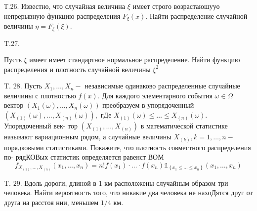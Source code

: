 \documentclass[a4paper,12pt]{article} %
\begin{document}
\begin{example}

Т.26. Известно, что случайная величина $\xi$ имеет строго возрастаюшууо непрерывную функцию распределения $F_{\xi}(x) .$ Найти распределение случайной величины $\eta=F_{\xi}(\xi) .$




\end{example}





\begin{example}

T.27. 

Пусть $\xi$ имеет имеет стандартное нормальное распределение. 
Найти функцию распределения и плотность случайной величины $\xi^{2}$




\end{example}



\begin{example}

T. $28 .$ Пусть $X_{1}, \ldots, X_{n}-$ независимые одинаково распределенные случайные величины с плотностью $f(x) .$ Для каждого элементарного события $\omega \in \Omega$ вектор $\left(X_{1}(\omega), \ldots, X_{n}(\omega)\right)$ преобразуем в упорядоченный $\left(X_{(1)}(\omega), \ldots, X_{(n)}(\omega)\right),$ гДе $X_{(1)}(\omega) \leq \ldots \leq X_{(n)}(\omega) .$ Упорядоченный век-
тор $\left(X_{(1)}, \ldots, X_{(n)}\right)$ в математической статистике называют вариационным рядом, а случайные величины $X_{(k)}, k=1, \ldots, n-$ порядковыми статистиками. Покажите, что плотность совместного распределения по-
рядКОВых статистик определяется равенст ВОМ
$$
f_{X_{(1)}, \ldots, X_{(n)}}\left(x_{1}, \ldots, x_{n}\right)=n ! f\left(x_{1}\right) \cdot \ldots \cdot f\left(x_{n}\right) \mathbb{1}_{\left\{x_{1} \leq \ldots \leq x_{n}\right\}}\left(x_{1}, \ldots, x_{n}\right)
$$




\end{example}



\begin{example}


T. $29 .$ Вдоль дороги, длиной в 1 км расположены случайным образом три человека. Найти вероятность того, что никакие два человека не нахоДятся друг от друга на расстоя нии, меньшем $1 / 4$ км.



\end{example}
\end{document}
